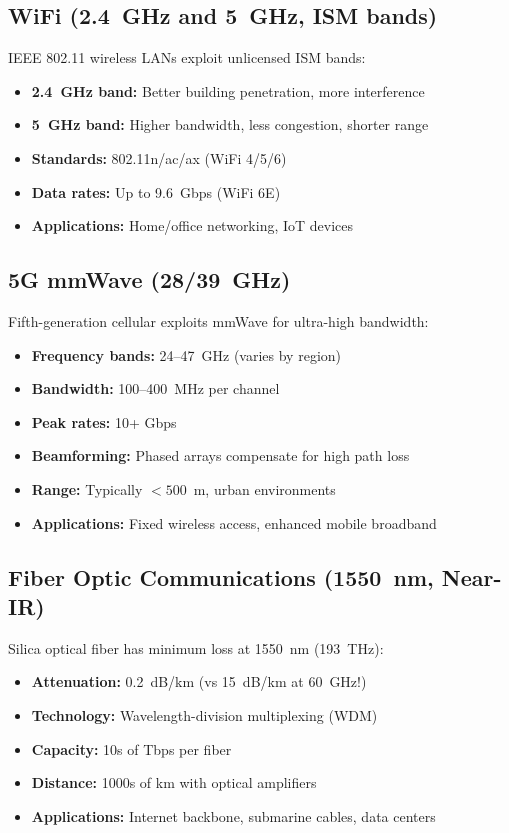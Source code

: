 \subsection{WiFi (2.4~GHz and 5~GHz, ISM bands)}

IEEE 802.11 wireless LANs exploit unlicensed ISM bands:
\begin{itemize}
\item \textbf{2.4~GHz band:} Better building penetration, more interference
\item \textbf{5~GHz band:} Higher bandwidth, less congestion, shorter range
\item \textbf{Standards:} 802.11n/ac/ax (WiFi 4/5/6)
\item \textbf{Data rates:} Up to 9.6~Gbps (WiFi 6E)
\item \textbf{Applications:} Home/office networking, IoT devices
\end{itemize}

\subsection{5G mmWave (28/39~GHz)}

Fifth-generation cellular exploits mmWave for ultra-high bandwidth:
\begin{itemize}
\item \textbf{Frequency bands:} 24--47~GHz (varies by region)
\item \textbf{Bandwidth:} 100--400~MHz per channel
\item \textbf{Peak rates:} 10+ Gbps
\item \textbf{Beamforming:} Phased arrays compensate for high path loss
\item \textbf{Range:} Typically $< 500$~m, urban environments
\item \textbf{Applications:} Fixed wireless access, enhanced mobile broadband
\end{itemize}

\subsection{Fiber Optic Communications (1550~nm, Near-IR)}

Silica optical fiber has minimum loss at 1550~nm (193~THz):
\begin{itemize}
\item \textbf{Attenuation:} 0.2~dB/km (vs 15~dB/km at 60~GHz!)
\item \textbf{Technology:} Wavelength-division multiplexing (WDM)
\item \textbf{Capacity:} 10s of Tbps per fiber
\item \textbf{Distance:} 1000s of km with optical amplifiers
\item \textbf{Applications:} Internet backbone, submarine cables, data centers
\end{itemize}

